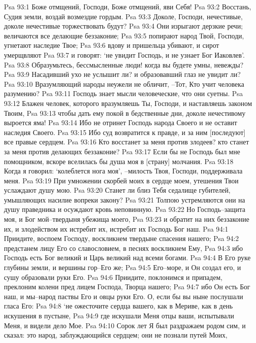 Psa 93:1  Боже отмщений, Господи, Боже отмщений, яви Себя!
Psa 93:2  Восстань, Судия земли, воздай возмездие гордым.
Psa 93:3  Доколе, Господи, нечестивые, доколе нечестивые торжествовать будут?
Psa 93:4  Они изрыгают дерзкие речи; величаются все делающие беззаконие;
Psa 93:5  попирают народ Твой, Господи, угнетают наследие Твое;
Psa 93:6  вдову и пришельца убивают, и сирот умерщвляют
Psa 93:7  и говорят: `не увидит Господь, и не узнает Бог Иаковлев'.
Psa 93:8  Образумьтесь, бессмысленные люди! когда вы будете умны, невежды?
Psa 93:9  Насадивший ухо не услышит ли? и образовавший глаз не увидит ли?
Psa 93:10  Вразумляющий народы неужели не обличит, --Тот, Кто учит человека разумению?
Psa 93:11  Господь знает мысли человеческие, что они суетны.
Psa 93:12  Блажен человек, которого вразумляешь Ты, Господи, и наставляешь законом Твоим,
Psa 93:13  чтобы дать ему покой в бедственные дни, доколе нечестивому выроется яма!
Psa 93:14  Ибо не отринет Господь народа Своего и не оставит наследия Своего.
Psa 93:15  Ибо суд возвратится к правде, и за ним [последуют] все правые сердцем.
Psa 93:16  Кто восстанет за меня против злодеев? кто станет за меня против делающих беззаконие?
Psa 93:17  Если бы не Господь был мне помощником, вскоре вселилась бы душа моя в [страну] молчания.
Psa 93:18  Когда я говорил: `колеблется нога моя', --милость Твоя, Господи, поддерживала меня.
Psa 93:19  При умножении скорбей моих в сердце моем, утешения Твои услаждают душу мою.
Psa 93:20  Станет ли близ Тебя седалище губителей, умышляющих насилие вопреки закону?
Psa 93:21  Толпою устремляются они на душу праведника и осуждают кровь неповинную.
Psa 93:22  Но Господь--защита моя, и Бог мой--твердыня убежища моего,
Psa 93:23  и обратит на них беззаконие их, и злодейством их истребит их, истребит их Господь Бог наш.
Psa 94:1  Приидите, воспоем Господу, воскликнем твердыне спасения нашего;
Psa 94:2  предстанем лицу Его со славословием, в песнях воскликнем Ему,
Psa 94:3  ибо Господь есть Бог великий и Царь великий над всеми богами.
Psa 94:4  В Его руке глубины земли, и вершины гор--Его же;
Psa 94:5  Его--море, и Он создал его, и сушу образовали руки Его.
Psa 94:6  Приидите, поклонимся и припадем, преклоним колени пред лицем Господа, Творца нашего;
Psa 94:7  ибо Он есть Бог наш, и мы--народ паствы Его и овцы руки Его. О, если бы вы ныне послушали гласа Его:
Psa 94:8  `не ожесточите сердца вашего, как в Мериве, как в день искушения в пустыне,
Psa 94:9  где искушали Меня отцы ваши, испытывали Меня, и видели дело Мое.
Psa 94:10  Сорок лет Я был раздражаем родом сим, и сказал: это народ, заблуждающийся сердцем; они не познали путей Моих,
